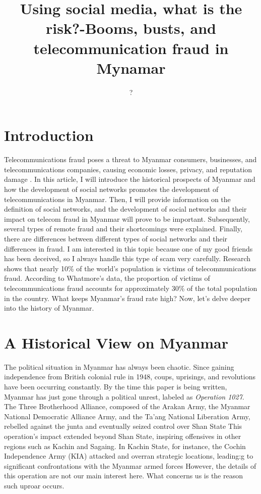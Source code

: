 \documentclass[man,floatsintext]{apa7}
\title{Using social media, what is the risk?-Booms, busts, and telecommunication fraud in Mynamar}
\author{?}
\affiliation{
Centre Number: 94825 \\
Candidate Number: ? \\
Unit Number: P301 \\
EPQ June 2024
}
\begin{document}
\maketitle
\tableofcontents
\newpage
\section{Introduction}

Telecommunications fraud poses a threat to Myanmar consumers, businesses, and telecommunications companies, causing economic losses, privacy, and reputation damage \autocite{graboskyTelecommunicationFraudDigital2001}. In this article, I will introduce the historical prospects of Myanmar and how the development of social networks promotes the development of telecommunications in Myanmar. Then, I will provide information on the definition of social networks, and the development of social networks and their impact on telecom fraud in Myanmar will prove to be important. Subsequently, several types of remote fraud and their shortcomings were explained. Finally, there are differences between different types of social networks and their differences in fraud. I am interested in this topic because one of my good friends has been deceived, so I always handle this type of scam very carefully. Research shows that nearly 10\% of the world's population is victims of telecommunications fraud. According to Whatmore's data, the proportion of victims of telecommunications fraud accounts for approximately 30\% of the total population in the country. What keeps Myanmar's fraud rate high? Now, let's delve deeper into the history of Myanmar.

\section{A Historical View on Myanmar}

The political situation in Myanmar has always been chaotic. Since gaining independence from British colonial rule in 1948, coups, uprisings, and revolutions have been occurring constantly. By the time this paper is being written, Myanmar has just gone through a political unrest, labeled as \textit{Operation 1027}. The Three Brotherhood Alliance, composed of the Arakan Army, the Myanmar National Democratic Alliance Army, and the Ta'ang National Liberation Army, rebelled against the junta and eventually seized control over Shan State \autocite{yunsunOperation1027Changing2024} This operation's impact extended beyond Shan State, inspiring offensives in other regions such as Kachin and Sagaing. In Kachin State, for instance, the Cochin Independence Army (KIA) attacked and overran strategic locations, leading:g to significant confrontations with the Myanmar armed forces \autocite{theinternationalinstituteforstrategicstudiesOperation1027Reshapes2023} However, the details of this operation are not our main interest here. What concerns us is the reason such uproar occurs.
\end{document}
